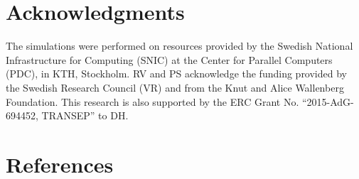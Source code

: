 \documentclass[preprint,12pt,authoryear]{elsarticle}
\begin{document}
\section*{Acknowledgments}

The simulations were performed on resources provided by the Swedish National Infrastructure for Computing (SNIC) at the Center for Parallel Computers (PDC), in KTH, Stockholm. RV and PS acknowledge the funding provided by the Swedish Research Council (VR) and from the Knut and Alice Wallenberg Foundation. This research is also supported by the ERC Grant No. ``2015-AdG-694452, TRANSEP'' to DH.

\section*{References}



 



%
%
%
\end{document}
